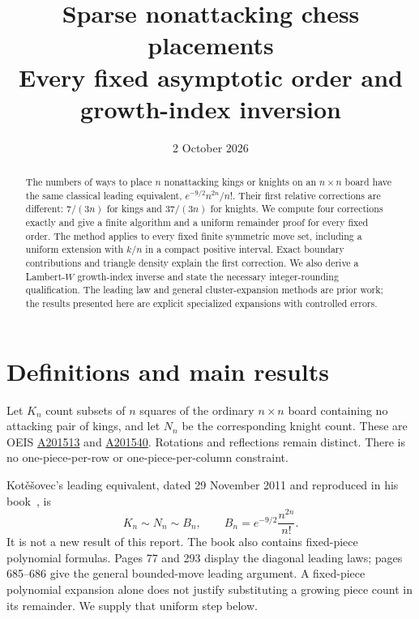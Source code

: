 \documentclass[11pt]{article}
\title{Sparse nonattacking chess placements\\\large Every fixed asymptotic order and growth-index inversion}
\author{}
\date{2 October 2026}
\begin{document}
\maketitle
\begin{abstract}
The numbers of ways to place $n$ nonattacking kings or knights on an $n\times n$ board have the same classical leading equivalent, $e^{-9/2}n^{2n}/n!$. Their first relative corrections are different: $7/(3n)$ for kings and $37/(3n)$ for knights. We compute four corrections exactly and give a finite algorithm and a uniform remainder proof for every fixed order. The method applies to every fixed finite symmetric move set, including a uniform extension with $k/n$ in a compact positive interval. Exact boundary contributions and triangle density explain the first correction. We also derive a Lambert-$W$ growth-index inverse and state the necessary integer-rounding qualification. The leading law and general cluster-expansion methods are prior work; the results presented here are explicit specialized expansions with controlled errors.
\end{abstract}

\section{Definitions and main results}\label{scp:sec:main}
Let $K_n$ count subsets of $n$ squares of the ordinary $n\times n$ board containing no attacking pair of kings, and let $N_n$ be the corresponding knight count. These are OEIS \href{https://oeis.org/A201513}{A201513} and \href{https://oeis.org/A201540}{A201540}. Rotations and reflections remain distinct. There is no one-piece-per-row or one-piece-per-column constraint.

Kot\v e\v sovec's leading equivalent, dated 29 November 2011 and reproduced in his book~\cite{Kote}, is
\begin{equation}\label{scp:eq:classical}
 K_n\sim N_n\sim B_n,\qquad B_n=e^{-9/2}\frac{n^{2n}}{n!}.
\end{equation}
It is not a new result of this report. The book also contains fixed-piece polynomial formulas. Pages 77 and 293 display the diagonal leading laws; pages 685--686 give the general bounded-move leading argument. A fixed-piece polynomial expansion alone does not justify substituting a growing piece count in its remainder. We supply that uniform step below.
\end{document}

